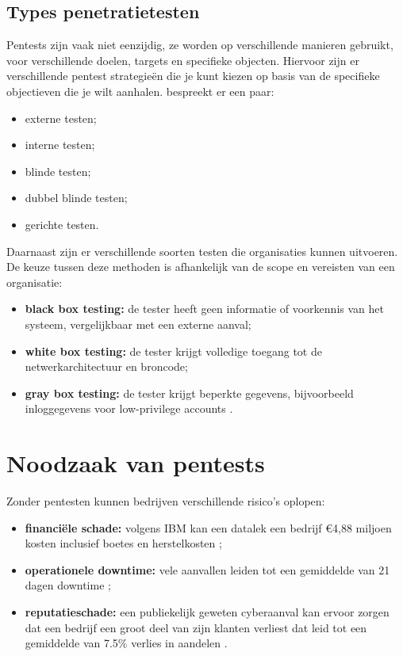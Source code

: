 \subsection{Types penetratietesten}
Pentests zijn vaak niet eenzijdig, ze worden op verschillende manieren gebruikt, voor verschillende doelen, targets en specifieke objecten.
Hiervoor zijn er verschillende pentest strategieën die je kunt kiezen op basis van de specifieke objectieven die je wilt aanhalen. \textcite{Vats2020} bespreekt er een paar: %

\begin{itemize}
    \item externe testen;
    \item interne testen;
    \item blinde testen;
    \item dubbel blinde testen;
    \item gerichte testen.
\end{itemize}

Daarnaast zijn er verschillende soorten testen die organisaties kunnen uitvoeren. De keuze tussen deze methoden is afhankelijk van de scope en vereisten van een organisatie:

\begin{itemize}
    \item \textbf{black box testing:} de tester heeft geen informatie of voorkennis van het systeem, vergelijkbaar met een externe aanval;
    \item \textbf{white box testing:} de tester krijgt volledige toegang tot de netwerkarchitectuur en broncode;
    \item \textbf{gray box testing:} de tester krijgt beperkte gegevens, bijvoorbeeld inloggegevens voor low-privilege accounts \autocite{Khamdamovich2021}.
\end{itemize}


\section{Noodzaak van pentests}
Zonder pentesten kunnen bedrijven verschillende risico's oplopen:

\begin{itemize}
    \item \textbf{financiële schade:} volgens IBM kan een datalek een bedrijf €4,88 miljoen kosten inclusief boetes en herstelkosten \autocite{IBM2024};
    \item \textbf{operationele downtime:} vele aanvallen leiden tot een gemiddelde van 21 dagen downtime \autocite{DBIR2023};
    \item \textbf{reputatieschade:} een publiekelijk geweten cyberaanval kan ervoor zorgen dat een bedrijf een groot deel van zijn klanten verliest dat leid tot een gemiddelde van 7.5\% verlies in aandelen \autocite{Ponemon2022,keman2023}.
\end{itemize}

